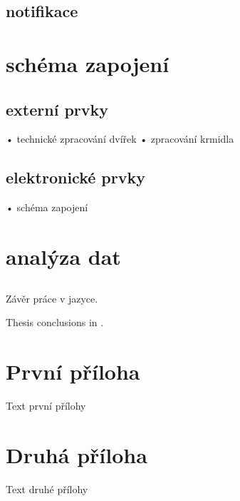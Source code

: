 \documentclass[
program=itp,
  biblatex,
  figures=false,
  glossaries,
  index
]{kidiplom}
\begin{document}
\subsection{notifikace}

\section{schéma zapojení}
\subsection{externí prvky}
•	technické zpracování dvířek
•	zpracování krmidla
\subsection{elektronické prvky}
•	schéma zapojení

\section{analýza dat}
\subsection{}

\begin{kiconclusions}
Závěr práce v  jazyce.
\end{kiconclusions}

\begin{kiconclusions}[english]
Thesis conclusions in .
\end{kiconclusions}

\appendix

\section{První příloha}
Text první přílohy

\section{Druhá příloha}
Text druhé přílohy

\end{document}
